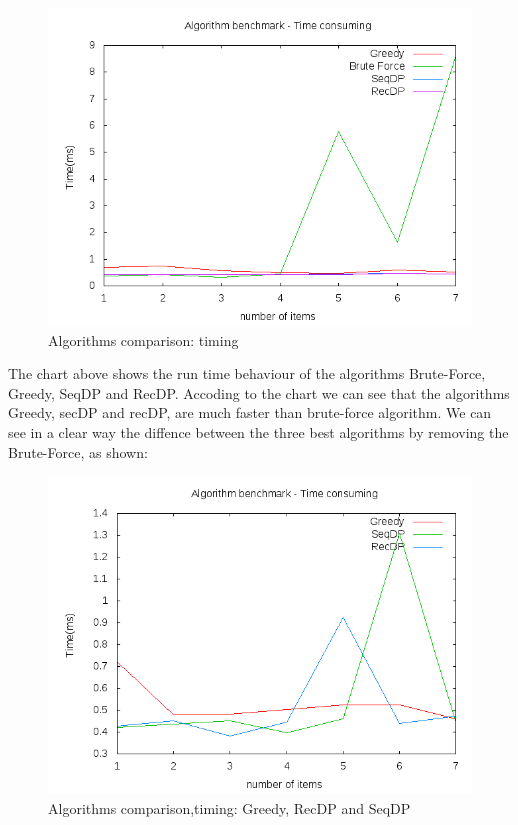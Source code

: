 \documentclass{article}
\begin{document}
\begin{figure} [H]
\centering
\includegraphics[scale=0.5]{report/time_analysis}
\caption{Algorithms comparison: timing}
\label{report/time_analysis}
\end{figure}

The chart above shows the run time behaviour of the algorithms Brute-Force, Greedy, SeqDP and RecDP. 
Accoding to the chart we can see that the algorithms Greedy, secDP and recDP, are much faster than brute-force algorithm.
We can see in a clear way the diffence between the three best algorithms by removing the Brute-Force, as shown: 

\begin{figure} [H]
\centering
\includegraphics[scale=0.5]{report/time_analysis_no_bf}
\caption{Algorithms comparison,timing: Greedy, RecDP and SeqDP}
\label{report/time_analysis_no_bf}
\end{figure}
\end{document}
